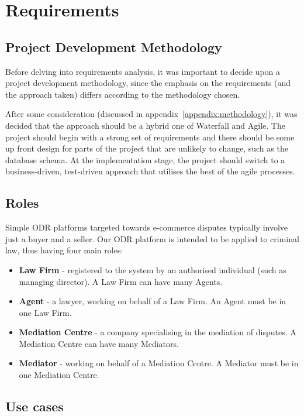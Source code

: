 \chapter{Requirements}\label{chapter:requirements}

\section{Project Development Methodology}

Before delving into requirements analysis, it was important to decide upon a project development methodology, since the emphasis on the requirements (and the approach taken) differs according to the methodology chosen.

After some consideration (discussed in appendix~\ref{appendix:methodology}), it was decided that the approach should be a hybrid one of Waterfall and Agile. The project should begin with a strong set of requirements and there should be some up front design for parts of the project that are unlikely to change, such as the database schema. At the implementation stage, the project should switch to a business-driven, test-driven approach that utilises the best of the agile processes.

\section{Roles}

Simple ODR platforms targeted towards e-commerce disputes typically involve just a buyer and a seller. Our ODR platform is intended to be applied to criminal law, thus having four main roles:

\begin{itemize}
\item \textbf{Law Firm} - registered to the system by an authorised individual (such as managing director). A Law Firm can have many Agents.
\item \textbf{Agent} - a lawyer, working on behalf of a Law Firm. An Agent must be in one Law Firm.
\item \textbf{Mediation Centre} - a company specialising in the mediation of disputes. A Mediation Centre can have many Mediators.
\item \textbf{Mediator} - working on behalf of a Mediation Centre. A Mediator must be in one Mediation Centre.
\end{itemize}

\section{Use cases}

